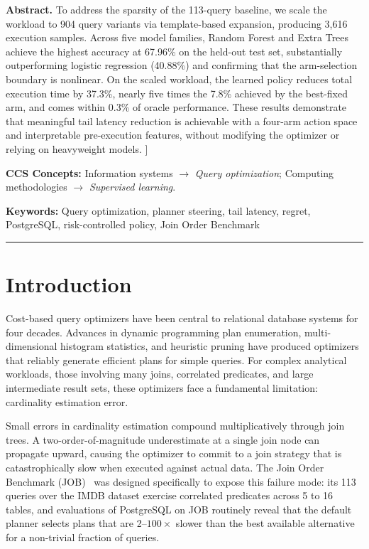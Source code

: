 \documentclass[sigconf,natbib=false]{article}
\renewenvironment{abstract}
  {\small\quotation\noindent\textbf{Abstract.}\enspace}
  {\endquotation}
\newcommand{\postgres}{PostgreSQL}
\begin{document}
{\begin{abstract}
To address the sparsity of the 113-query baseline, we scale the workload to 904 query
variants via template-based expansion, producing 3{,}616 execution samples. Across five
model families, Random Forest and Extra Trees achieve the highest accuracy at 67.96\% on the
held-out test set, substantially outperforming logistic regression (40.88\%) and confirming
that the arm-selection boundary is nonlinear. On the scaled workload, the learned policy
reduces total execution time by 37.3\%, nearly five times the 7.8\% achieved by the
best-fixed arm, and comes within 0.3\% of oracle performance. These results demonstrate
that meaningful tail latency reduction is achievable with a four-arm action space and
interpretable pre-execution features, without modifying the optimizer or relying on
heavyweight models.
\end{abstract}
\vspace{8pt}
}]

\noindent\textbf{CCS Concepts:} Information systems $\to$ \textit{Query optimization}; Computing methodologies $\to$ \textit{Supervised learning}.\par
\noindent\textbf{Keywords:} Query optimization, planner steering, tail latency, regret, PostgreSQL, risk-controlled policy, Join Order Benchmark
\par\vspace{6pt}
\rule{\columnwidth}{0.4pt}
\vspace{4pt}

\section{Introduction}

Cost-based query optimizers have been central to relational database systems for four
decades. Advances in dynamic programming plan enumeration, multi-dimensional histogram
statistics, and heuristic pruning have produced optimizers that reliably generate efficient
plans for simple queries. For complex analytical workloads, those involving many joins, correlated
predicates, and large intermediate result sets, these optimizers face a fundamental limitation:
cardinality estimation error.

Small errors in cardinality estimation compound multiplicatively through join trees. A
two-order-of-magnitude underestimate at a single join node can propagate upward, causing the
optimizer to commit to a join strategy that is catastrophically slow when executed against
actual data. The Join Order Benchmark (JOB)~\cite{Leis2015} was designed specifically to
expose this failure mode: its 113 queries over the IMDB dataset exercise correlated predicates
across 5 to 16 tables, and evaluations of \postgres{} on JOB routinely reveal that the default
planner selects plans that are 2--$100\times$ slower than the best available alternative for
a non-trivial fraction of queries.
\end{document}
